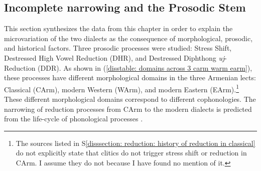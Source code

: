 		
		
		
		
		
	












\subsection{Incomplete narrowing and the Prosodic Stem }\label{disssection: reduction: history of reduction in classical: discussion}
This section synthesizes the data from this chapter in  order to explain the microvariation of the two dialects as the consequence of morphological, prosodic, and historical factors.  Three prosodic processes were studied: Stress Shift, Destressed High Vowel Reduction (DHR), and Destressed Diphthong \textit{uj}-Reduction (DDR). As shown in   (\ref{disstable: domains across 3 carm warm earm}), these   processes have different  morphological domains in the three Armenian lects: Classical (CArm), modern Western (WArm), and  modern Eastern  (EArm).\footnote{ The sources listed in S\ref{disssection: reduction: history of reduction in classical}  do not {explicitly} state that clitics  do not trigger stress shift or reduction in CArm. I assume  they do not because I have found no mention of it. }  These different morphological domains correspond to different cophonologies. The narrowing of   reduction processes from CArm to the modern dialects is   predicted from the life-cycle of phonological processes \citep{Ramsammy-2015-LifeCyclephonoDialectalTypology}.

